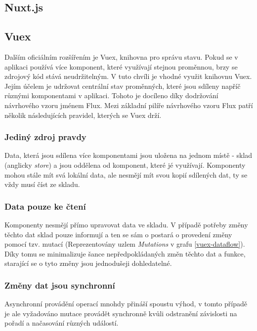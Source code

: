 \subsection{Nuxt.js} %
\blindtext

\subsection{Vuex}
Dalším oficiálním rozšířením je Vuex, knihovna pro správu stavu. Pokud se v aplikaci používá více komponent, které využívají stejnou proměnnou, brzy se zdrojový kód stává neudržitelným. 
V tuto chvíli je vhodné využit knihovnu Vuex. Jejím účelem je udržovat centrální stav proměnných, které jsou sdíleny napříč různými komponentami v aplikaci. Tohoto je docíleno díky dodržování návrhového vzoru jménem Flux. Mezi základní pilíře návrhového vzoru Flux patří několik následujících pravidel, kterých se Vuex drží. 


\subsubsection*{Jediný zdroj pravdy}
Data, která jsou sdílena více komponentami jsou uložena na jednom místě - sklad (anglicky \emph{store}) a jsou oddělena od komponent, které jé využívají. Komponenty mohou stále mít svá lokální data, ale nesmějí mít svou kopií sdílených dat, ty se vždy musí číst ze skladu.

\subsubsection*{Data pouze ke čtení}
Komponenty nesmějí přímo upravovat data ve skladu. V případě potřeby změny těchto dat sklad pouze informují a ten se sám o postará o provedení změny pomocí tzv. mutací (Reprezentovány uzlem \emph{Mutations} v grafu \ref{vuex-dataflow}). Díky tomu se minimalizuje šance nepředpokládaných změn těchto dat a funkce, starající se o tyto změny jsou jednodušeji dohledatelné.


\subsubsection*{Změny dat jsou synchronní}
Asynchronní provádění operací mnohdy přináší spoustu výhod, v tomto případě je ale vyžadováno mutace provádět synchronně kvůli odstranění závislosti na pořadí a načasování různých událostí.


